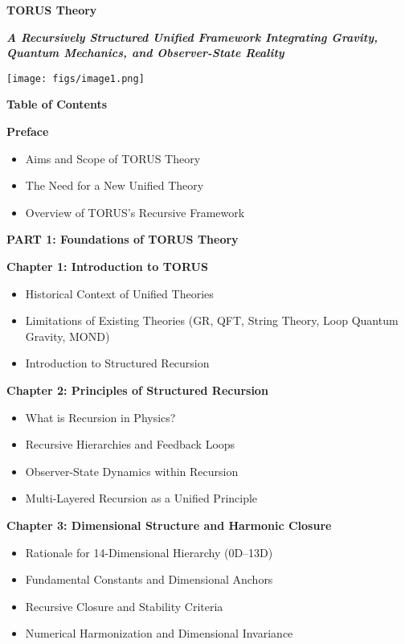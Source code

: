 \documentclass[
]{article}
\author{}
\date{}
\begin{document}
\textbf{TORUS Theory\\
}

\emph{\textbf{A Recursively Structured Unified Framework Integrating
Gravity, Quantum Mechanics, and Observer-State Reality}}

\texttt{[image: figs/image1.png]}

\textbf{Table of Contents}

\textbf{Preface}

\begin{itemize}
\item
  Aims and Scope of TORUS Theory
\item
  The Need for a New Unified Theory
\item
  Overview of TORUS's Recursive Framework
\end{itemize}

\textbf{PART 1: Foundations of TORUS Theory}

\textbf{Chapter 1: Introduction to TORUS}

\begin{itemize}
\item
  Historical Context of Unified Theories
\item
  Limitations of Existing Theories (GR, QFT, String Theory, Loop Quantum
  Gravity, MOND)
\item
  Introduction to Structured Recursion
\end{itemize}

\textbf{Chapter 2: Principles of Structured Recursion}

\begin{itemize}
\item
  What is Recursion in Physics?
\item
  Recursive Hierarchies and Feedback Loops
\item
  Observer-State Dynamics within Recursion
\item
  Multi-Layered Recursion as a Unified Principle
\end{itemize}

\textbf{Chapter 3: Dimensional Structure and Harmonic Closure}

\begin{itemize}
\item
  Rationale for 14-Dimensional Hierarchy (0D--13D)
\item
  Fundamental Constants and Dimensional Anchors
\item
  Recursive Closure and Stability Criteria
\item
  Numerical Harmonization and Dimensional Invariance
\end{itemize}
\end{document}
